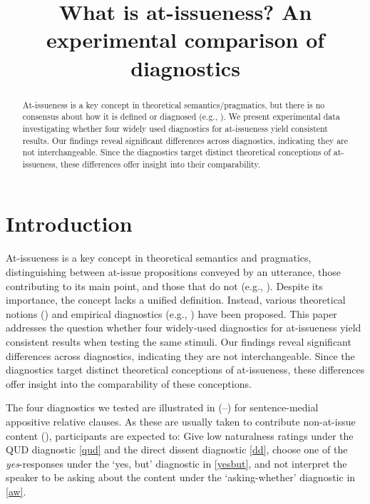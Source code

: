 \documentclass[times,linguex,xcolor]{glossa}
\title[What is at-issueness?]{What is at-issueness? An experimental comparison of diagnostics\\ 
  }
\author[]%
{%
}
\begin{document}
\maketitle


\begin{abstract}
  At-issueness is a key concept in theoretical semantics/pragmatics, but there is no consensus about how it is defined or diagnosed (e.g., \citealt{tonhauser_diagnosing_2012,tonhauser_how_2018,koev_notions_2018}). We present experimental data investigating whether four widely used diagnostics for at-issueness yield consistent results. Our findings reveal significant differences across diagnostics, indicating they are not interchangeable. Since the diagnostics target distinct theoretical conceptions of at-issueness, these differences offer insight into their comparability.

\end{abstract}


\section{Introduction \label{sec:1_introduction}}

  At-issueness is a key concept in theoretical semantics and pragmatics, distinguishing between at-issue propositions conveyed by an utterance, those contributing to its main point, and those that do not (e.g., \citealt{karttunen_conventional_1979,horton_presuppositions_1988,abbott_presuppositions_2000,faller_semantics_2003,potts_logic_2005,tonhauser_diagnosing_2012}). Despite its importance, the concept lacks a unified definition. Instead, various theoretical notions (\citealt{koev_notions_2018,tonhauser_how_2018}) and empirical diagnostics (e.g., \citealt{tonhauser_diagnosing_2012}) have been proposed. This paper addresses the question whether four widely‐used diagnostics for at-issueness yield consistent results when testing the same stimuli. Our findings reveal significant differences across diagnostics, indicating they are not interchangeable. Since the diagnostics target distinct theoretical conceptions of at-issueness, these differences offer insight into the comparability of these conceptions.

  The four diagnostics we tested are illustrated in (--) for sentence-medial appositive relative clauses. As these are usually taken to contribute non-at-issue content (\citealt{potts_logic_2005}), participants are expected to: Give low naturalness ratings under the QUD diagnostic \ref{qud} and the direct dissent diagnostic \ref{dd}, choose one of the \emph{yes}-responses under the `yes, but' diagnostic in \ref{yesbut}, and not interpret the speaker to be asking about the content under the `asking-whether' diagnostic in \ref{aw}.
\end{document}
